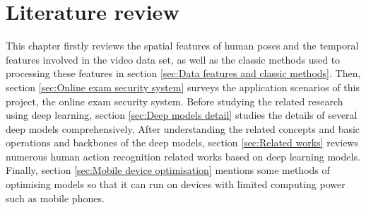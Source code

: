 \chapter{Literature review}
\label{chap:Literature review}
This chapter firstly reviews the spatial features of human poses and the temporal features involved in the video data set, as well as the classic methods used to processing these features in section \ref{sec:Data features and classic methods}.
Then, section \ref{sec:Online exam security system} surveys the application scenarios of this project, the online exam security system.
Before studying the related research using deep learning, section \ref{sec:Deep models detail} studies the details of several deep models comprehensively.
After understanding the related concepts and basic operations and backbones of the deep models, section \ref{sec:Related works} reviews numerous human action recognition related works based on deep learning models.
Finally, section \ref{sec:Mobile device optimisation} mentions some methods of optimising models so that it can run on devices with limited computing power such as mobile phones.
